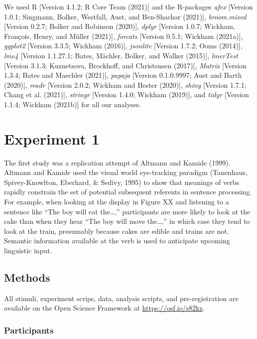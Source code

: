 \documentclass[
  english,
  man,floatsintext]{apa6}
\begin{document}
We used R {[}Version 4.1.2; R Core Team (2021){]} and the R-packages \emph{afex} {[}Version 1.0.1; Singmann, Bolker, Westfall, Aust, and Ben-Shachar (2021){]}, \emph{broom.mixed} {[}Version 0.2.7; Bolker and Robinson (2020){]}, \emph{dplyr} {[}Version 1.0.7; Wickham, François, Henry, and Müller (2021){]}, \emph{forcats} {[}Version 0.5.1; Wickham (2021a){]}, \emph{ggplot2} {[}Version 3.3.5; Wickham (2016){]}, \emph{jsonlite} {[}Version 1.7.2; Ooms (2014){]}, \emph{lme4} {[}Version 1.1.27.1; Bates, Mächler, Bolker, and Walker (2015){]}, \emph{lmerTest} {[}Version 3.1.3; Kuznetsova, Brockhoff, and Christensen (2017){]}, \emph{Matrix} {[}Version 1.3.4; Bates and Maechler (2021){]}, \emph{papaja} {[}Version 0.1.0.9997; Aust and Barth (2020){]}, \emph{readr} {[}Version 2.0.2; Wickham and Hester (2020){]}, \emph{shiny} {[}Version 1.7.1; Chang et al. (2021){]}, \emph{stringr} {[}Version 1.4.0; Wickham (2019){]}, and \emph{tidyr} {[}Version 1.1.4; Wickham (2021b){]} for all our analyses.

\hypertarget{experiment-1}{%
\section{Experiment 1}\label{experiment-1}}

The first study was a replication attempt of Altmann and Kamide (1999). Altmann and Kamide used the visual world eye-tracking paradigm (Tanenhaus, Spivey-Knowlton, Eberhard, \& Sedivy, 1995) to show that meanings of verbs rapidly constrain the set of potential subsequent referents in sentence processing. For example, when looking at the display in Figure XX and listening to a sentence like ``The boy will eat the\ldots,'' participants are more likely to look at the cake than when they hear ``The boy will move the\ldots,'' in which case they tend to look at the train, presumably because cakes are edible and trains are not. Semantic information available at the verb is used to anticipate upcoming linguistic input.

\hypertarget{methods}{%
\subsection{Methods}\label{methods}}

All stimuli, experiment scrips, data, analysis scripts, and pre-registration are available on the Open Science Framework at \url{https://osf.io/s82kz}.

\hypertarget{participants-1}{%
\subsubsection{Participants}\label{participants-1}}
\end{document}
